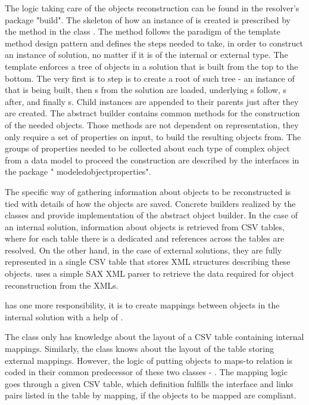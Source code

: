The logic taking care of the objects reconstruction can be found in the resolver's package "build".
The skeleton of how an instance of  is created is prescribed by the method  in the class . The method follows the paradigm of the template method design pattern and defines the steps needed to take, in order to construct an instance of  solution, no matter if it is of the internal or external type.
The template enforces a tree of objects in a solution that is built from the top to the bottom.
The very first is to step is to create a root of such tree - an instance of  that is being built, then s from the solution are loaded, underlying s follow, s after, and finally s. 
Child instances are appended to their parents just after they are created.
The abstract builder contains common methods for the construction of the needed objects. 
Those methods are not dependent on representation, they only require a set of properties on input, to build the resulting objects from. 
The groups of properties needed to be collected about each type of complex object from a data model to proceed the construction are described by the interfaces in the package " modeledobjectproperties".

The specific way of gathering information about objects to be reconstructed is tied with details of how the objects are saved. 
Concrete builders realized by the classes  and  provide implementation of the abstract object builder.
In the case of an internal solution, information about objects is retrieved from CSV tables, where for each table there is a dedicated and references across the tables are resolved.
On the other hand, in the case of external solutions, they are fully represented in a single CSV table that stores XML structures describing these objects. 
 uses a simple SAX XML parser to retrieve the data required for object reconstruction from the XMLs.

 has one more responsibility, it is to create mappings between  objects in the internal solution with a help of . 

The  class only has knowledge about the layout of a CSV table containing internal mappings. Similarly, the  class knows about the layout of the table storing external mappings.
However, the logic of putting objects to maps-to relation is coded in their common predecessor of these two classes - .
The mapping logic goes through a given CSV table, which definition fulfills the interface  and links pairs listed in the table by mapping, if the objects to be mapped are compliant.

